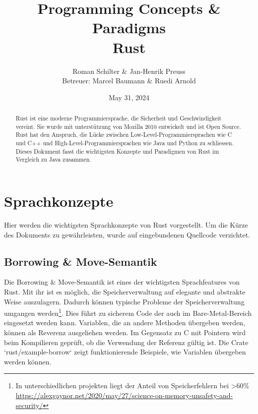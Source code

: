 \documentclass[letterpaper,12pt]{article}
\begin{document}
    \title{Programming Concepts \& Paradigms\\Rust}
    \author{Roman Schilter \& Jan-Henrik Preuss\\[0.4cm]{\small Betreuer: Marcel Baumann \& Ruedi Arnold}}
    \date{May 31, 2024}
    \maketitle


    \begin{abstract}
        Rust ist eine moderne Programmiersprache, die Sicherheit und Geschwindigkeit vereint.
        Sie wurde mit unterstützung von Mozilla 2010 entwickelt und ist Open Source.
        Rust hat den Anspruch, die Lücke zwischen Low-Level-Programmiersprachen wie C und C++ und High-Level-Programmiersprachen wie Java und Python zu schliessen.
        Dieses Dokument fasst die wichtigsten Konzepte und Paradigmen von Rust im Vergleich zu Java zusammen.
    \end{abstract}



    \section{Sprachkonzepte}

    Hier werden die wichtigsten Sprachkonzepte von Rust vorgestellt.
    Um die Kürze des Dokuments zu gewährleisten, wurde auf eingebundenen Quellcode verzichtet.

    \subsection{Borrowing \& Move-Semantik}\label{subsec:borrowing-&-move-semantik}
    Die Borrowing \& Move-Semantik ist eines der wichtigsten Sprachfeatures von Rust.
    Mit ihr ist es möglich, die Speicherverwaltung auf elegante und abstrakte Weise auszulagern.
    Dadurch können typische Probleme der Speicherverwaltung umgangen werden\footnote
    {In unterschiedlichen projekten liegt der Anteil von Speicherfehlern bei \textgreater 60\% \url{https://alexgaynor.net/2020/may/27/science-on-memory-unsafety-and-security/}}.
    Dies führt zu sicherem Code der auch im Bare-Metal-Bereich eingesetzt werden kann.
    Variablen, die an andere Methoden übergeben werden, können als Reverenz ausgeliehen werden.
    Im Gegensatz zu C mit Pointern wird beim Kompilieren geprüft, ob die Verwendung der Referenz gültig ist.
    Die Crate `rust/example-borrow` zeigt funktionierende Beispiele, wie Variablen übergeben werden können.
\end{document}
